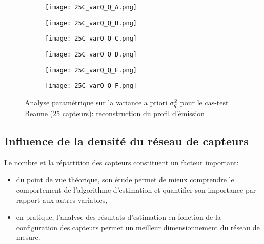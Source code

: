 \begin{figure}[p!]
	\centering
	\begin{subfigure}[t]{0.5\textwidth}
		\centering
		\texttt{[image: 25C\_varQ\_Q\_A.png]}
		\caption{}
		\label{varq_A_q}
	\end{subfigure}%
	\begin{subfigure}[t]{0.5\textwidth}
		\centering
		\texttt{[image: 25C\_varQ\_Q\_B.png]}
		\caption{}
		\label{varq_B_q}
	\end{subfigure}
	\begin{subfigure}[t]{0.5\textwidth}
		\centering
		\texttt{[image: 25C\_varQ\_Q\_C.png]}
		\caption{}
		\label{varq_C_q}
	\end{subfigure}%
	\begin{subfigure}[t]{0.5\textwidth}
		\centering
		\texttt{[image: 25C\_varQ\_Q\_D.png]}
		\caption{}
		\label{varq_D_q}
	\end{subfigure}
	\begin{subfigure}[t]{0.5\textwidth}
		\centering
		\texttt{[image: 25C\_varQ\_Q\_E.png]}
		\caption{}
		\label{varq_E_q}
	\end{subfigure}%
	\begin{subfigure}[t]{0.5\textwidth}
		\centering
		\texttt{[image: 25C\_varQ\_Q\_F.png]}
		\caption{}
		\label{varq_F_q}
	\end{subfigure}
	\caption{Analyse paramétrique sur la variance a priori $\sigma_q^2$ pour le cas-test Beaune (25 capteurs): reconstruction du profil d'émission}
	\label{fig_25C_analyse_varq_q}
\end{figure}



\subsection{Influence de la densité du réseau de capteurs}

{Le nombre et la répartition des capteurs constituent} un facteur important: 

\begin{itemize}
	\item du point de vue théorique, son étude permet de mieux comprendre le comportement de l'algorithme d'estimation et quantifier son importance par rapport aux autres variables,
	\item en pratique, l'analyse des résultats d'estimation en fonction de la configuration des capteurs permet un meilleur dimensionnement du réseau de mesure.\\
\end{itemize}

